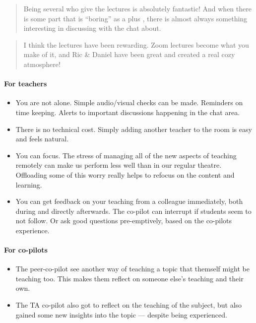 \documentclass{article}
\begin{document}
\begin{quote}
Being several who give the lectures is absolutely fantastic! And when there
is some part that is \enquote{boring} as a plus , there is almost always something
interesting in discussing with the chat about.
\end{quote}

\begin{quote}
I think the lectures have been rewarding. Zoom lectures become what you
make of it, and Ric \& Daniel have been great and created a real cozy
atmosphere!
\end{quote}

\paragraph{For teachers}

\begin{itemize}
  \item You are not alone. Simple audio/visual checks can be made. Reminders on 
    time keeping. Alerts to important discussions happening in the chat area.

  \item There is no technical cost. Simply adding another teacher to the room 
    is easy and feels natural.

  \item You can focus. The stress of managing all of the new aspects of 
    teaching remotely can make us perform less well than in our regular 
    theatre. Offloading some of this worry really helps to refocus on the 
    content and learning.

  \item You can get feedback on your teaching from a colleague immediately, 
    both during and directly afterwards.
    The co-pilot can interrupt if students seem to not follow.
    Or ask good questions pre-emptively, based on the co-pilots experience.
\end{itemize}

\paragraph{For co-pilots}

\begin{itemize}
  \item The peer-co-pilot see another way of teaching a topic that themself 
    might be teaching too.
    This makes them reflect on someone else's teaching and their own.

  \item The TA co-pilot also got to reflect on the teaching of the subject, but 
    also gained some new insights into the topic --- despite being experienced.
\end{itemize}
\end{document}
